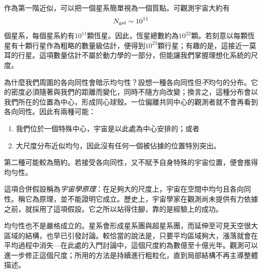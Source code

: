 作為第一階近似，可以把一個星系簡單視為一個質點。可觀測宇宙大約有
\begin{equation}
N_{\rm gal}\sim 10^{11}
\end{equation}
個星系，每個星系約有\(10^{11}\)顆恆星。因此，恆星總數約為\(10^{22}\)顆。若刻意以每顆恆星有十顆行星作為粗略的數量級估計，便得到\(10^{23}\)顆行星；有趣的是，這接近一莫耳的行星。這項數量估計不屬於動力學的一部分，但能讓我們掌握理想化系統的尺度。

\begin{classroomqa}
\end{classroomqa}

為什麼我們周圍的各向同性會暗示均勻性？設想一種各向同性但\emph{不}均勻的分布。它的密度必須隨著與我們的距離而變化，同時不隨方向改變；換言之，這種分布會以我們所在的位置為中心，形成同心球殼。一位偏離共同中心的觀測者就不會再看到各向同性。因此有兩種可能：
\begin{enumerate}
\item 我們位於一個特殊中心，宇宙是以此處為中心安排的；或者
\item 大尺度分布近似均勻，因此沒有任何一個被佔據的位置特別突出。
\end{enumerate}
第二種可能較為簡約。若接受各向同性，又不賦予自身特殊的宇宙位置，便會推得均勻性。

\begin{classroomqa}
\end{classroomqa}

這項合併假設稱為\emph{宇宙學原理}：在足夠大的尺度上，宇宙在空間中均勻且各向同性。稱它為原理，並不能證明它成立。歷史上，宇宙學家在觀測尚未提供有力依據之前，就採用了這項假設。它之所以站得住腳，靠的是經驗上的成功。

均勻性也不是嚴格成立的。星系會形成星系團與超星系團，而延伸至可見天空很大區域的結構，也早已引發討論。較恰當的說法是，只要平均區域夠大，漲落就會在平均過程中消失---在此處的入門討論中，這個尺度約為數億至十億光年。觀測可以進一步修正這個尺度；所用的方法是持續進行粗粒化，直到局部結構不再主導整體描述。

